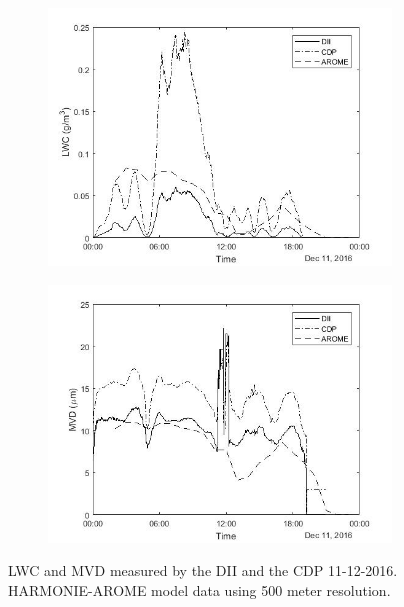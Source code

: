 \begin{figure}[ht]
\centering
\begin{subfigure}[t]{.85\textwidth}
  \centering
  \includegraphics[width=1\linewidth]{figures/161211/30min_lwc_CDP_DII_SMHI_161211_adjusted}
  \label{fig:161211_LWCvstime}
\end{subfigure}%

\begin{subfigure}[t]{.85\textwidth}
  \centering
  \includegraphics[width=1\linewidth]{figures/161211/30min_mvd_CDP_DII_SMHI_161211_adjusted}
  \label{fig:161211_MVDvstime}
\end{subfigure}
\caption{LWC and MVD measured by the DII and the CDP 11-12-2016. HARMONIE-AROME model data using 500 meter resolution. }
\label{fig:161211_mvd_lwc}
\end{figure}

